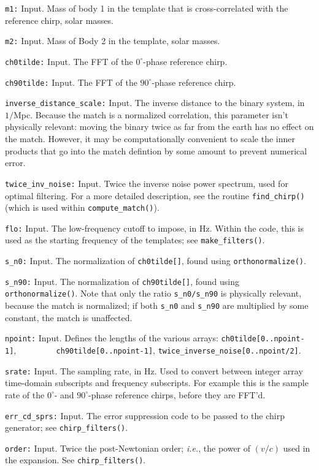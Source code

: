 \begin{description}
\item{{\tt m1:}} Input. Mass of body 1 in the template that is
cross-correlated with the reference chirp, solar masses.
\item{{\tt m2:}} Input. Mass of Body 2 in the template, solar masses.
\item{{\tt ch0tilde:}} Input. The FFT of the $0^\circ$-phase reference
chirp.
\item{{\tt ch90tilde:}} Input. The FFT of the $90^\circ$-phase
reference chirp.
\item{{\tt inverse\_distance\_scale:}} Input. The inverse distance
to the binary system, in $1/$Mpc.  Because the match is a normalized
correlation, this parameter isn't physically relevant: moving the
binary twice as far from the earth has no effect on the match.
However, it may be computationally convenient to scale the inner
products that go into the match defintion by some amount to prevent
numerical error.
\item{{\tt twice\_inv\_noise:}} Input. Twice the inverse noise
power spectrum, used for optimal filtering.  For a more detailed
description, see the routine {\tt find\_chirp()} (which is used
within {\tt compute\_match()}).
\item{{\tt flo:}} Input. The low-frequency cutoff to impose, in Hz.
Within the code, this is used as the starting frequency of the
templates; see {\tt make\_filters()}.
\item{{\tt s\_n0:}} Input. The normalization of {\tt ch0tilde[]},
found using {\tt orthonormalize()}.
\item{{\tt s\_n90:}} Input. The normalization of {\tt ch90tilde[]},
found using {\tt orthonormalize()}.  Note that only the ratio
{\tt s\_n0/s\_n90} is physically relevant, because the match is
normalized; if both {\tt s\_n0} and {\tt s\_n90} are multiplied by
some constant, the match is unaffected.
\item{{\tt npoint:}} Input. Defines the lengths of the various arrays:
{\tt ch0tilde[0..npoint-1]}, $\qquad \qquad$ {\tt ch90tilde[0..npoint-1]},
{\tt twice\_inverse\_noise[0..npoint/2]}.
\item{{\tt srate:}} Input. The sampling rate, in Hz.  Used to convert
between integer array time-domain subscripts and frequency subscripts.
For example this is the sample rate of the $0^\circ$- and
$90^\circ$-phase reference chirps, before they are FFT'd.
\item{{\tt err\_cd\_sprs:}} Input. The error suppression code to be
passed to the chirp generator; see {\tt chirp\_filters()}.
\item{{\tt order:}} Input. Twice the post-Newtonian order; {\it i.e.},
the power of $(v/c)$ used in the expansion.  See {\tt chirp\_filters()}.
\end{description}

